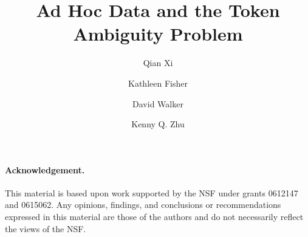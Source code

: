 \documentclass{llncs}
\begin{document}
\title{Ad Hoc Data and the Token Ambiguity Problem}

\author{Qian Xi \and Kathleen Fisher \and David Walker 
  \and Kenny Q. Zhu}




\maketitle{}










\paragraph*{Acknowledgement.}
This material is based upon work supported by the NSF under grants
0612147 and
0615062. Any opinions, findings, and conclusions or recommendations
expressed in this material are those of the authors and do not
necessarily reflect the views of the NSF.

%

%


%
\end{document}
